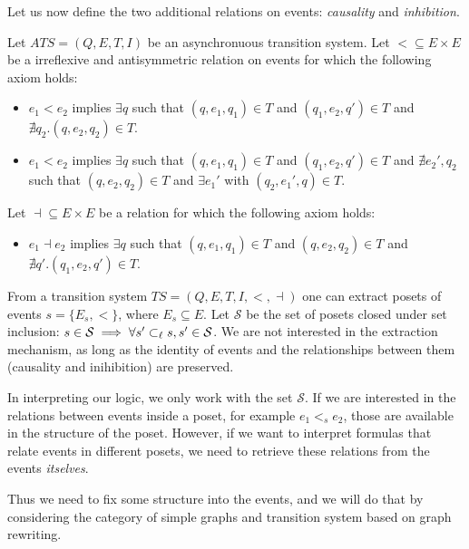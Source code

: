 Let us now define the two additional relations on events: \emph{causality} and \emph{inhibition}.

\begin{definition}
  Let $ATS = (Q,E,T,I)$ be an asynchronuous transition system. Let $< \subseteq E\times E$ be a irreflexive and antisymmetric relation on events for which the following axiom holds:
  \begin{itemize}
  \item $e_1< e_2$ implies $\exists q$ such that $(q,e_1,q_1)\in T$ and $(q_1,e_2,q')\in T$ and $\nexists q_2.(q,e_2,q_2)\in T$.
  \item $e_1< e_2$ implies $\exists q$ such that $(q,e_1,q_1)\in T$ and $(q_1,e_2,q')\in T$ and $\nexists e_2',q_2$ such that $(q,e_2,q_2)\in T$ and $\exists e_1'$ with $(q_2,e_1',q)\in T$.
  \end{itemize}
  Let $\dashv\subseteq E \times E$ be a relation for which the following axiom holds:
  \begin{itemize}
  \item $e_1\dashv e_2$ implies $\exists q$ such that $(q,e_1,q_1)\in T$ and $(q,e_2,q_2)\in T$ and $\nexists q'.(q_1,e_2,q')\in T$.
  \end{itemize}
\end{definition}

From a transition system $TS = (Q,E,T,I,<,\dashv)$ one can extract posets of events $s=\{E_s,<\}$, where $E_s\subseteq E$.
Let $\mathcal{S}$ be the set of posets closed under set inclusion: $s\in \mathcal{S} \implies \forall s'\subset_{\ell} s, s'\in\mathcal{S}$. We are not interested in the extraction mechanism, as long as the identity of events and the relationships between them (causality and inihibition) are preserved.

In interpreting our logic, we only work with the set $\mathcal{S}$. If we are interested in the relations between events inside a poset, for example $e_1<_s e_2$, those are available in the structure of the poset. However, if we want to interpret formulas that relate events in different posets, we need to retrieve these relations from the events \emph{itselves}.

Thus we need to fix some structure into the events, and we will do that by considering the category of simple graphs and transition system based on graph rewriting.

